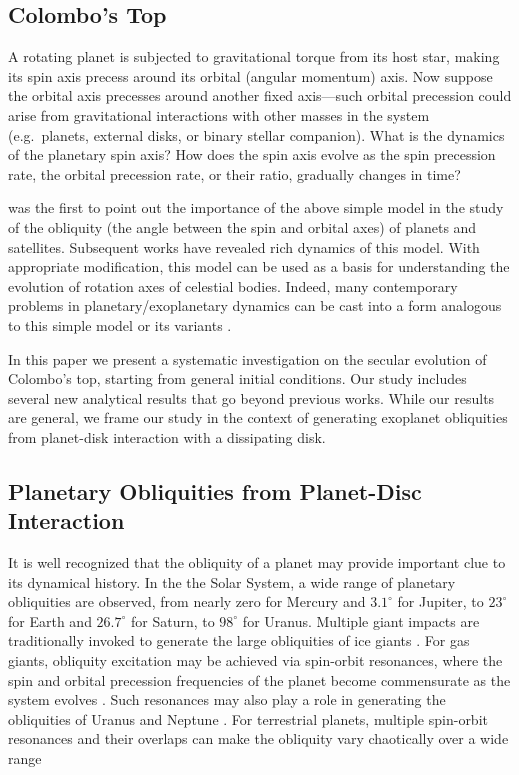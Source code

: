 \documentclass[twocolumn,twocolappendix]{aastex63}
\begin{document}
\subsection{Colombo's Top}

A rotating planet is subjected to gravitational torque from its host star,
making its spin axis precess around its orbital (angular momentum) axis.  Now
suppose the orbital axis precesses around another fixed axis---such orbital
precession could arise from gravitational interactions with other masses in the
system (e.g.\ planets, external disks, or binary stellar companion). What is the
dynamics of the planetary spin axis?  How does the spin axis evolve as the spin
precession rate, the orbital precession rate, or their ratio, gradually changes
in time?

\citet{colombo1966} was the first to point out the importance of the above
simple model in the study of the obliquity (the angle between the spin and
orbital axes) of planets and satellites. Subsequent works
\citep{peale1969,peale1974possible,ward1975tidal,henrard1987} have revealed rich
dynamics of this model. With appropriate modification, this model can be used as
a basis for understanding the evolution of rotation axes of celestial bodies.
Indeed, many contemporary problems in planetary/exoplanetary dynamics can be
cast into a form analogous to this simple model or its variants
\citep[e.g.][]{ward2004I, fabrycky_otides, batygin2013magnetic, lai2014star,
anderson2018teeter,zanazzi2018planet}.

In this paper we present a systematic investigation on the secular evolution of
Colombo's top, starting from general initial conditions. Our study includes
several new analytical results that go beyond previous works. While our results
are general, we frame our study in the context of generating exoplanet
obliquities from planet-disk interaction with a dissipating disk.

\subsection{Planetary Obliquities from Planet-Disc Interaction}

It is well recognized that the obliquity of a planet may provide important clue
to its dynamical history. In the the Solar System, a wide range of planetary
obliquities are observed, from nearly zero for Mercury and $3.1^\circ$ for
Jupiter, to $23^\circ$ for Earth and $26.7^\circ$ for Saturn, to $98^\circ$ for
Uranus. Multiple giant impacts are traditionally invoked to generate the large
obliquities of ice giants \citep{original_gi, benz1989tilting,
korycansky1990one, morbidelli_gi}. For gas giants, obliquity excitation may be
achieved via spin-orbit resonances, where the spin and orbital precession
frequencies of the planet become commensurate as the system evolves
\citep{ward2004I, ward2004II, vokrouhlicky2015tilting}. Such resonances may also
play a role in generating the obliquities of Uranus and Neptune
\citep{hamilton_tilting_ice}. For terrestrial planets, multiple spin-orbit
resonances and their overlaps can make the obliquity vary chaotically over a
wide range \citep[e.g.][]{laskar1993chaotic, touma1993chaotic, correia2003long}
\end{document}
